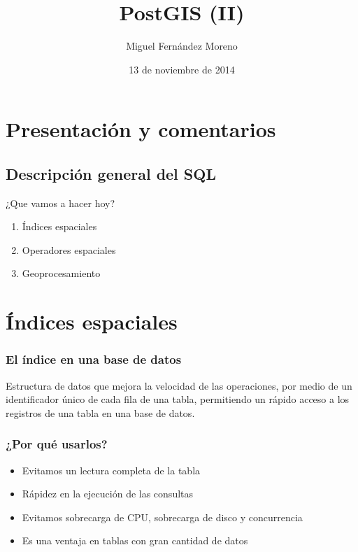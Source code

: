\documentclass{classes/beamer_GeomaticaUA}
\author{Miguel Fernández Moreno}
\title{PostGIS (II)}
\institute[GeomaticaLab]{Instituto Interuniversitario de Geografía\\Laboratorio de Geomática}
\date{13 de noviembre de 2014}
\begin{document}
\begin{frame}
\titlepage
\end{frame}

\section[Introducción]{Presentación y comentarios}
\subsection{Descripción general del SQL}
\begin{frame}{¿Que vamos a hacer hoy?}
\begin{enumerate}
\item Índices espaciales
\item Operadores espaciales
\item Geoprocesamiento
\end{enumerate}
\end{frame}


\section[Índices]{Índices espaciales}
\begin{frame}[fragile]
\frametitle{El índice en una base de datos}
Estructura de datos que mejora la velocidad de las operaciones, por medio de un identificador único de cada fila de una tabla, permitiendo un rápido acceso a los registros de una tabla en una base de datos. 
\end{frame}

\begin{frame}[fragile]
\frametitle{¿Por qué usarlos?}
\begin{itemize}
\item Evitamos un lectura completa de la tabla
\item Rápidez en la ejecución de las consultas
\item Evitamos sobrecarga de CPU, sobrecarga de disco y concurrencia
\item Es una ventaja en tablas con gran cantidad de datos
\end{itemize}
\end{frame}
\end{document}
